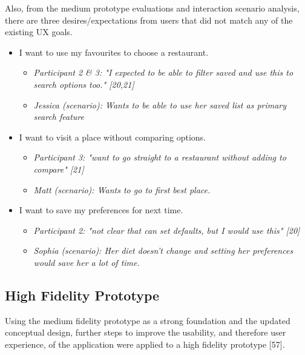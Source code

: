 \documentclass[a4 paper, 12pt]{article}
\begin{document}
    Also, from the medium prototype evaluations and interaction scenario analysis, there are three desires/expectations from users that did not match any of the existing UX goals. 
        \begin{itemize}
            \item I want to use my favourites to choose a restaurant.  
                \begin{itemize}
                    \item \textit{Participant 2 \& 3: "I expected to be able to filter saved and use this to search options too." [20,21]}
                    \item \textit{Jessica (scenario): Wants to be able to use her saved list as primary search feature}
                \end{itemize}
            \item I want to visit a place without comparing options. 
                \begin{itemize}
                    \item \textit{Participant 3: "want to go straight to a restaurant without adding to compare" [21]}
                    \item \textit{Matt (scenario): Wants to go to first best place.}
                \end{itemize}
            \item I want to save my preferences for next time. 
                \begin{itemize}
                    \item \textit{Participant 2: "not clear that can set defaults, but I would use this" [20]}
                    \item \textit{Sophia (scenario): Her diet doesn't change and setting her preferences would save her a lot of time.}
                \end{itemize}          
        \end{itemize}


\subsection{High Fidelity Prototype}
Using the medium fidelity prototype as a strong foundation and the updated conceptual design, further steps to improve the usability, and therefore user experience, of the application were applied to a high fidelity prototype [57].
\end{document}
